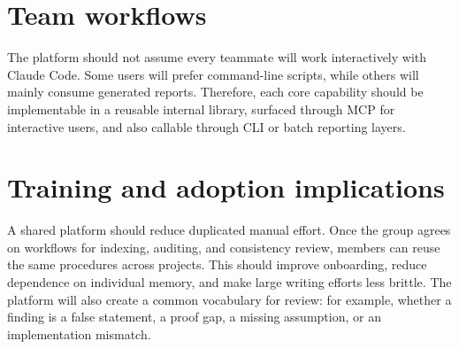 \section{Team workflows}

The platform should not assume every teammate will work interactively with Claude Code. Some users will prefer command-line scripts, while others will mainly consume generated reports. Therefore, each core capability should be implementable in a reusable internal library, surfaced through MCP for interactive users, and also callable through CLI or batch reporting layers.

\section{Training and adoption implications}

A shared platform should reduce duplicated manual effort. Once the group agrees on workflows for indexing, auditing, and consistency review, members can reuse the same procedures across projects. This should improve onboarding, reduce dependence on individual memory, and make large writing efforts less brittle. The platform will also create a common vocabulary for review: for example, whether a finding is a false statement, a proof gap, a missing assumption, or an implementation mismatch.
